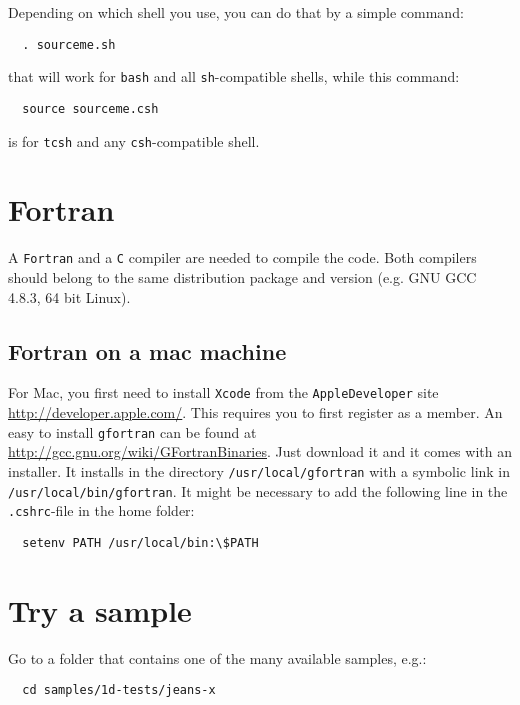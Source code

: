 \documentclass[a4paper,12pt]{article}
\begin{document}
Depending on which shell you use, you can do that by a simple command:

\begin{verbatim}
  . sourceme.sh
\end{verbatim}

that will work for \verb|bash| and all \verb|sh|-compatible shells, while this command:

\begin{verbatim}
  source sourceme.csh
\end{verbatim}

is for \verb|tcsh| and any \verb|csh|-compatible shell.


\section{Fortran}

A \verb|Fortran| and a \verb|C| compiler are needed to compile the code.
Both compilers should belong to the same distribution package and version (e.g. GNU GCC 4.8.3, 64 bit Linux).

\subsection{Fortran on a mac machine}
For Mac, you first need to install \verb|Xcode| from the \verb|AppleDeveloper|
site \url{http://developer.apple.com/}. This requires you to first register as a
member. An easy to install \verb|gfortran| can be found at \newline
\url{http://gcc.gnu.org/wiki/GFortranBinaries}. Just download it and it comes
with an installer. It installs in the directory \verb|/usr/local/gfortran| with
a symbolic link in \verb|/usr/local/bin/gfortran|. It might be necessary to add
the following line in the \verb|.cshrc|-file in the home folder:
\begin{verbatim} 
  setenv PATH /usr/local/bin:\$PATH 
\end{verbatim}


\section{Try a sample}

Go to a folder that contains one of the many available samples, e.g.:

\begin{verbatim}
  cd samples/1d-tests/jeans-x
\end{verbatim}
\end{document}

